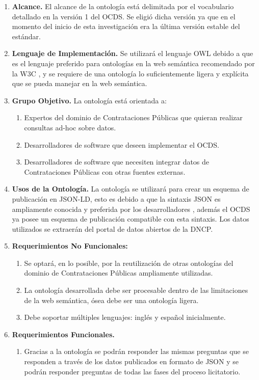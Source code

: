 \begin{enumerate}
\item \textbf{Alcance.} El alcance de la ontología está delimitada por el vocabulario detallado en la versión 1 del OCDS. Se eligió dicha versión ya que en el momento del inicio de esta investigación era la última versión estable del estándar.
\item \textbf{Lenguaje de Implementación.} Se utilizará el lenguaje OWL debido a que es el lenguaje preferido para ontologías en la web semántica recomendado por la W3C \cite{OWLSeman72:online}, y se requiere de una ontología lo suficientemente ligera y explícita que se pueda manejar en la web semántica.
\item \textbf{Grupo Objetivo. }La ontología está orientada a:
\begin{enumerate}
    \item Expertos del dominio de Contrataciones Públicas que quieran realizar consultas ad-hoc sobre datos.
    \item Desarrolladores de software que deseen implementar el OCDS.
    \item Desarrolladores de software que necesiten integrar datos de Contrataciones Públicas con otras fuentes externas. \end{enumerate}
\item \textbf{Usos de la Ontología.} La ontología se utilizará para crear un esquema de publicación en JSON-LD, esto es debido a que la sintaxis JSON es ampliamente conocida y preferida por los desarrolladores \cite{JSONLDSy39:online}, además el OCDS ya posee un esquema de publicación compatible con esta sintaxis. Los datos utilizados se extraerán del portal de datos abiertos de la DNCP.
\item \textbf{Requerimientos No Funcionales: }
\begin{enumerate}
    \item Se optará, en lo posible, por la reutilización de otras ontologías del dominio de Contrataciones Públicas ampliamente utilizadas.
    \item La ontología desarrollada debe ser procesable dentro de las limitaciones de la web semántica, ósea debe ser una ontología ligera.
    \item Debe soportar múltiples lenguajes: inglés y español inicialmente.
\end{enumerate}
\item \textbf{Requerimientos Funcionales. }
    \begin{enumerate}
        \item Gracias a la ontología se podrán responder las mismas preguntas que se responden a través de los datos publicados en formato de JSON y se podrán responder preguntas de todas las fases del proceso licitatorio.

\end{enumerate}
\end{enumerate}
